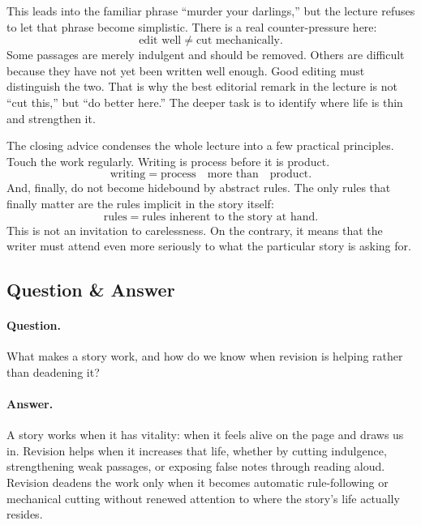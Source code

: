 This leads into the familiar phrase ``murder your darlings,'' but the lecture refuses to let that phrase become simplistic. There is a real counter-pressure here:
\begin{equation}
\text{edit well} \neq \text{cut mechanically}.
\end{equation}
Some passages are merely indulgent and should be removed. Others are difficult because they have not yet been written well enough. Good editing must distinguish the two. That is why the best editorial remark in the lecture is not ``cut this,'' but ``do better here.'' The deeper task is to identify where life is thin and strengthen it.

The closing advice condenses the whole lecture into a few practical principles. Touch the work regularly. Writing is process before it is product.
\begin{equation}
\text{writing} = \text{process} \quad \text{more than} \quad \text{product}.
\end{equation}
And, finally, do not become hidebound by abstract rules. The only rules that finally matter are the rules implicit in the story itself:
\begin{equation}
\text{rules} = \text{rules inherent to the story at hand}.
\end{equation}
This is not an invitation to carelessness. On the contrary, it means that the writer must attend even more seriously to what the particular story is asking for.

\subsection{Question \& Answer}

\paragraph{Question.} What makes a story work, and how do we know when revision is helping rather than deadening it?

\paragraph{Answer.} A story works when it has vitality: when it feels alive on the page and draws us in. Revision helps when it increases that life, whether by cutting indulgence, strengthening weak passages, or exposing false notes through reading aloud. Revision deadens the work only when it becomes automatic rule-following or mechanical cutting without renewed attention to where the story's life actually resides.

